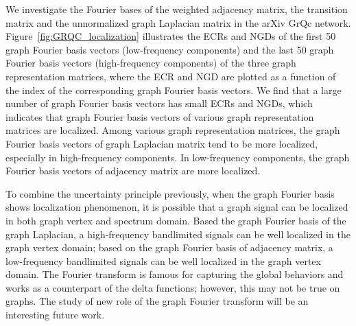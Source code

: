 \documentclass[journal,twocolumn,10pt]{IEEEtran}
\theoremstyle{definition}
\begin{document}
We investigate the Fourier bases of the weighted adjacency matrix, the transition matrix  and the unnormalized  graph Laplacian matrix in the arXiv GrQc network. 
 Figure~\ref{fig:GRQC_localization} illustrates the ECRs and NGDs of the first 50 graph Fourier basis vectors (low-frequency components) and the last 50 graph Fourier basis vectors (high-frequency components) of the three graph representation matrices, where the ECR and NGD are plotted as a function of the index of the corresponding graph Fourier basis vectors. We find that a large number of graph Fourier basis vectors has small ECRs and NGDs, which indicates that graph Fourier basis vectors of various graph representation matrices are localized. Among various graph representation matrices, the graph Fourier basis vectors of graph Laplacian matrix tend to be more localized, especially in high-frequency components. In low-frequency components, the graph Fourier basis vectors of adjacency matrix are more localized.

To combine the uncertainty principle previously, when the graph Fourier basis shows localization phenomenon, it is possible that a graph signal can be localized in both graph vertex and spectrum domain. Based the graph Fourier basis of the graph Laplacian, a high-frequency bandlimited signals can be well localized in the graph vertex domain; based on the graph Fourier basis of adjacency matrix, a low-frequency bandlimited signals can be well localized in the graph vertex domain.  The Fourier transform is famous for capturing the global behaviors and works as a counterpart of the delta functions; however, this may not be true on graphs. The study of new role of the graph Fourier transform will be an interesting future work.
\end{document}

